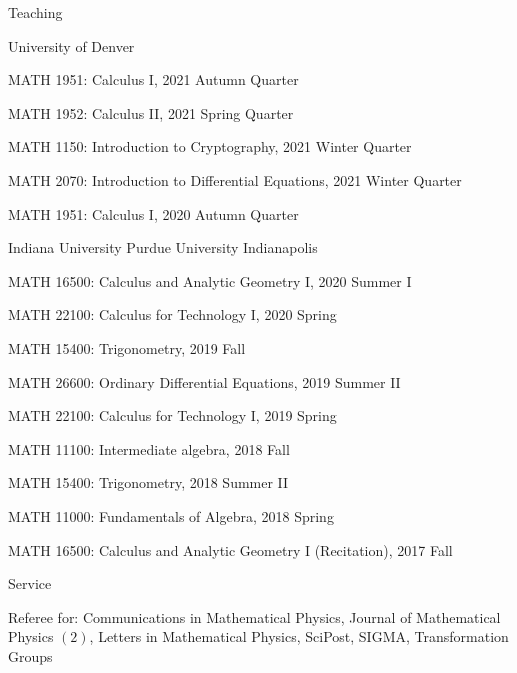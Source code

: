 \documentclass{resume} %
\begin{document}
\begin{rSection}{Teaching}
\begin{rSubsection}{University of Denver}{}
{}{}
  \item {MATH 1951: Calculus I, 2021 Autumn Quarter}\\
  \item {MATH 1952: Calculus II, 2021 Spring Quarter}\\
  \item {MATH 1150: Introduction to Cryptography, 2021 Winter Quarter}\\
  \item {MATH 2070: Introduction to Differential Equations, 2021 Winter Quarter}\\
  \item {MATH 1951: Calculus I, 2020 Autumn Quarter}\\
\end{rSubsection}

\begin{rSubsection}{Indiana University Purdue University Indianapolis}{}
{}{}
  \item {MATH 16500: Calculus and Analytic Geometry I, 2020 Summer I}\\
  \item {MATH 22100: Calculus for Technology I, 2020 Spring}\\
  \item {MATH 15400: Trigonometry, 2019 Fall}\\
  \item {MATH 26600: Ordinary Differential Equations, 2019 Summer II}\\
  \item {MATH 22100: Calculus for Technology I, 2019 Spring}\\
  \item {MATH 11100: Intermediate algebra, 2018 Fall}\\
  \item {MATH 15400: Trigonometry, 2018 Summer II}\\
  \item {MATH 11000: Fundamentals of Algebra, 2018 Spring}\\
  \item {MATH 16500: Calculus and Analytic Geometry I (Recitation), 2017 Fall}\\
\end{rSubsection}
\end{rSection}

\begin{rSection}{Service}
\begin{rSubsection}{}{}
{}{}
\item Referee for: Communications in Mathematical Physics, Journal of Mathematical Physics $(2)$, Letters in Mathematical Physics, SciPost, SIGMA, Transformation Groups \\ 	
\end{rSubsection}
\end{rSection}
\end{document}
